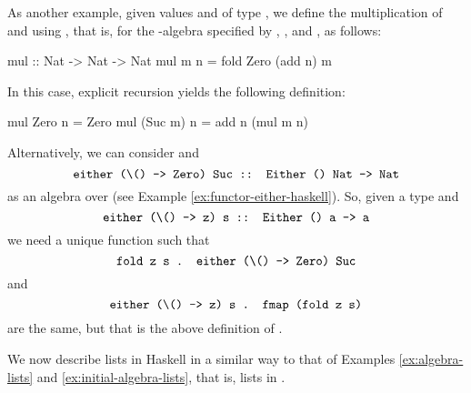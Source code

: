 \begin{example}
  As another example, given values  and 
  of type , we define the multiplication of
   and  using , that is,  for the
  -algebra specified by ,
  , and , as follows:
  \begin{codehaskell}
mul :: Nat -> Nat -> Nat
mul m n = fold Zero (add n) m
  \end{codehaskell}
  In this case, explicit recursion yields the following definition:
  \begin{codehaskell}
mul Zero    n = Zero
mul (Suc m) n = add n (mul m n)
  \end{codehaskell}

\end{example}

Alternatively, we can consider  and
\begin{equation*}
  \text{\texttt{either (\textbackslash () -> Zero) Suc :: Either () Nat -> Nat}}
\end{equation*}
as an algebra over  (see Example
\ref{ex:functor-either-haskell}). So, given a type  and
\begin{equation*}
  \text{\texttt{either (\textbackslash () -> z) s :: Either () a -> a}}
\end{equation*}
we need a unique function  such that
\begin{equation*}
  \text{\texttt{fold z s . either (\textbackslash () -> Zero) Suc}}
\end{equation*}
and
\begin{equation*}
  \text{\texttt{either (\textbackslash () -> z) s . fmap (fold z s)}}
\end{equation*}
are the same, but that is the above definition of .

We now describe lists in Haskell in a similar way to that of Examples
\ref{ex:algebra-lists} and \ref{ex:initial-algebra-lists}, that is,
lists in \set.

